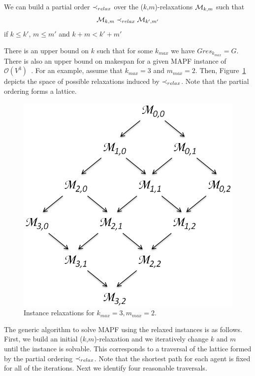 We can build a partial order $\mathrel{\prec_{relax}}$ over the ($k$,$m$)-relaxations ${\mathcal{M}}_{k,m}$ such that
\[
{\mathcal{M}}_{k,m} \mathrel{\prec_{relax}} {\mathcal{M}}_{k',m'}
\]
\noindent if $k \leq k'$, $m\leq m'$ and $k+m < k'+m'$

There is an upper bound on $k$ such that for some $k_{max}$ we have $Gres_{k_{max}} = G$. There is also an upper bound on makespan for a given MAPF instance of $\mathcal{O}(V^3)$~\cite{pebble_motion}. %
For an example, assume that $k_{max}=3$ and $m_{max}=2$. Then, Figure~\ref{fig:example-relax} depicts the space of possible relaxations induced by $\mathrel{\prec_{relax}}$. Note that the partial ordering forms a lattice.

\begin{figure}[h]
  \centering
  \includegraphics[width=0.65\columnwidth]{img/km_relax}
  \caption{Instance relaxations for \(k_{max}=3, m_{max}=2\).}
  \label{fig:example-relax}
\end{figure}

The generic algorithm to solve MAPF using the relaxed instances is as follows. First, we build an initial ($k$,$m$)-relaxation and we iteratively change $k$ and $m$ until the instance is solvable. This corresponds to a traversal of the lattice formed by the partial ordering $\mathrel{\prec_{relax}}$. Note that the shortest path for each agent is fixed for all of the iterations. Next we identify four reasonable traversals.



